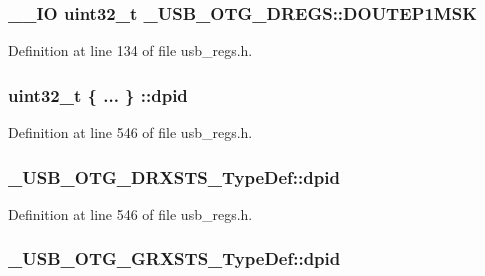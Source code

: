 \hypertarget{group___u_s_b___o_t_g___d_r_i_v_e_r_gaea965165ff1048dba0abc17c284f3e79}{
\subsubsection[{D\-O\-U\-T\-E\-P1\-M\-S\-K}]{\setlength{\rightskip}{0pt plus 5cm}\-\_\-\-\_\-\-I\-O {\bf uint32\-\_\-t} \-\_\-\-U\-S\-B\-\_\-\-O\-T\-G\-\_\-\-D\-R\-E\-G\-S\-::\-D\-O\-U\-T\-E\-P1\-M\-S\-K}}\label{group___u_s_b___o_t_g___d_r_i_v_e_r_gaea965165ff1048dba0abc17c284f3e79}


Definition at line 134 of file usb\-\_\-regs.\-h.

\hypertarget{group___u_s_b___o_t_g___d_r_i_v_e_r_ga772def29ebc82a3c839c10e861ecea8b}{
\subsubsection[{dpid}]{\setlength{\rightskip}{0pt plus 5cm}uint32\-\_\-t \{ ... \} \-::dpid}}\label{group___u_s_b___o_t_g___d_r_i_v_e_r_ga772def29ebc82a3c839c10e861ecea8b}


Definition at line 546 of file usb\-\_\-regs.\-h.

\hypertarget{group___u_s_b___o_t_g___d_r_i_v_e_r_gab6a62e50cc115337d81dd3a86bc9ce56}{
\subsubsection[{dpid}]{ \-\_\-\-U\-S\-B\-\_\-\-O\-T\-G\-\_\-\-D\-R\-X\-S\-T\-S\-\_\-\-Type\-Def\-::dpid}}\label{group___u_s_b___o_t_g___d_r_i_v_e_r_gab6a62e50cc115337d81dd3a86bc9ce56}


Definition at line 546 of file usb\-\_\-regs.\-h.

\hypertarget{group___u_s_b___o_t_g___d_r_i_v_e_r_gaa694a3bd21aec4905205948d31e5576c}{
\subsubsection[{dpid}]{ \-\_\-\-U\-S\-B\-\_\-\-O\-T\-G\-\_\-\-G\-R\-X\-S\-T\-S\-\_\-\-Type\-Def\-::dpid}}\label{group___u_s_b___o_t_g___d_r_i_v_e_r_gaa694a3bd21aec4905205948d31e5576c}


